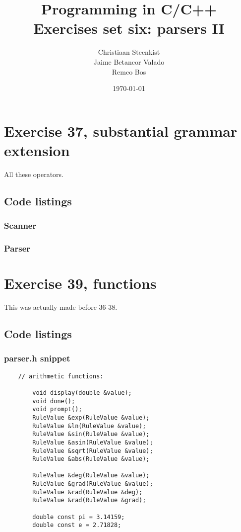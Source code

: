 \documentclass[11pt]{article}
\begin{document}
\title{Programming in C/C++ \\
       Exercises set six: parsers II
}
\date{\today}
\author{Christiaan Steenkist \\
Jaime Betancor Valado \\
Remco Bos \\
}

\maketitle
\section*{Exercise 37, substantial grammar extension}
All these operators.

\subsection*{Code listings}
\subsubsection*{Scanner}


\subsubsection*{Parser}
%
%


\section*{Exercise 39, functions}
This was actually made before 36-38.

\subsection*{Code listings}

\subsubsection*{parser.h snippet}
\begin{lstlisting}
	// arithmetic functions:
	
		void display(double &value);
		void done();
		void prompt();
		RuleValue &exp(RuleValue &value);
		RuleValue &ln(RuleValue &value);
		RuleValue &sin(RuleValue &value);
		RuleValue &asin(RuleValue &value);
		RuleValue &sqrt(RuleValue &value);
		RuleValue &abs(RuleValue &value);
		
		RuleValue &deg(RuleValue &value);		
		RuleValue &grad(RuleValue &value);
		RuleValue &rad(RuleValue &deg);
		RuleValue &rad(RuleValue &grad);
		
		double const pi = 3.14159;
		double const e = 2.71828;
\end{lstlisting}
\end{document}
